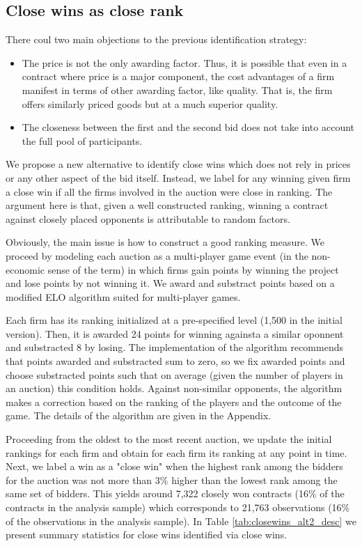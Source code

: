\subsection{Close wins as close rank}
There coul two main objections to the previous identification strategy:
\begin{itemize}
  \item The price is not the only awarding factor. Thus, it is possible that even in a contract where price is a major component, the cost advantages of a firm manifest in terms of other awarding factor, like quality. That is, the firm offers similarly priced goods but at a much superior quality.
  \item The closeness between the first and the second bid does not take into account the full pool of participants.
\end{itemize}

We propose a new alternative to identify close wins which does not rely in prices or any other aspect of the bid itself. Instead, we label for any winning given firm a close win if all the firms involved in the auction were close in ranking. The argument here is that, given a well constructed ranking, winning a contract against closely placed opponents is attributable to random factors.

Obviously, the main issue is how to construct a good ranking measure. We proceed by  modeling each auction as a multi-player game event (in the non-economic sense of the term) in which firms gain points by winning the project and lose points by not winning it. We award and substract points based on a modified ELO algorithm suited for multi-player games.

Each firm has its ranking initialized at a pre-specified level (1,500 in the initial version). Then, it is awarded 24 points for winning againsta a similar oponnent and substracted 8 by losing. The implementation of the algorithm recommends that points awarded and substracted sum to zero, so we fix awarded points and choose substracted points such that on average (given the number of players in an auction) this condition holds. Against non-similar opponents, the algorithm makes a correction based on the ranking of the players and the outcome of the game. The details of the algorithm are given in the Appendix.

Proceeding from the oldest to the most recent auction, we update the initial rankings for each firm and obtain for each firm its ranking at any point in time. Next, we label a win as a "close win" when the highest rank among the bidders for the auction was not more than 3\% higher than the lowest rank among the same set of bidders. This yields around 7,322 closely won contracts (16\% of the contracts in the analysis sample) which corresponds to 21,763 observations (16\% of the observations in the analysis sample). In Table \ref{tab:closewins_alt2_desc} we present summary statistics for close wins identified via close wins.

